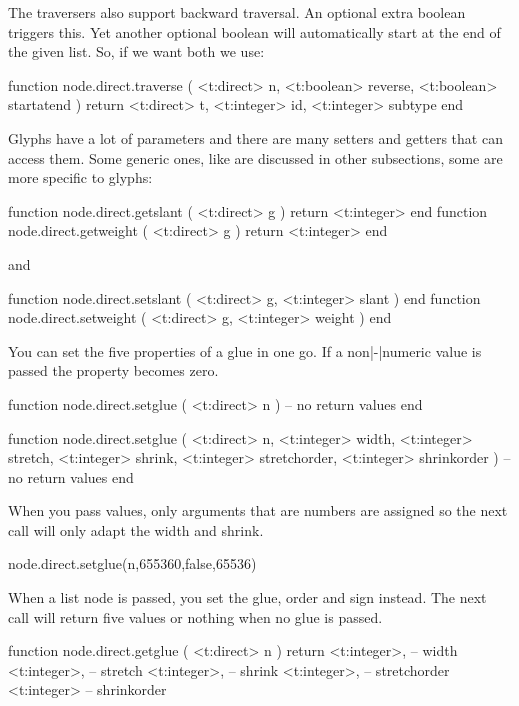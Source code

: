 The traversers also support backward traversal. An optional extra boolean triggers
this. Yet another optional boolean will automatically start at the end of the
given list. So, if we want both we use:

\starttyping[option=LUA]
function node.direct.traverse (
    <t:direct>  n,
    <t:boolean> reverse,
    <t:boolean> startatend
)
    return
        <t:direct>  t,
        <t:integer> id,
        <t:integer> subtype
end
\stoptyping

\stopsubsection

\startsubsection[title={Glyphs}]

Glyphs have a lot of parameters and there are many setters and getters that
can access them. Some generic ones, like  are discussed
in other subsections, some are more specific to glyphs:

\starttyping[option=LUA]
function node.direct.getslant  ( <t:direct> g ) return <t:integer> end
function node.direct.getweight ( <t:direct> g ) return <t:integer> end
\stoptyping

and

\starttyping[option=LUA]
function node.direct.setslant  ( <t:direct> g, <t:integer> slant  ) end
function node.direct.setweight ( <t:direct> g, <t:integer> weight ) end
\stoptyping

\stopsubsection

\startsubsection[title={Glue}]

You can set the five properties of a glue in one go. If a non|-|numeric value is
passed the property becomes zero.

\starttyping[option=LUA]
function node.direct.setglue ( <t:direct> n )
    -- no return values
end

function node.direct.setglue (
    <t:direct>  n,
    <t:integer> width,
    <t:integer> stretch,
    <t:integer> shrink,
    <t:integer> stretchorder,
    <t:integer> shrinkorder
)
    -- no return values
end
\stoptyping

When you pass values, only arguments that are numbers are assigned so the next
call will only adapt the width and shrink.

\starttyping[option=LUA]
node.direct.setglue(n,655360,false,65536)
\stoptyping


When a list node is passed, you set the glue, order and sign instead. The next
call will return five values or nothing when no glue is passed.

\starttyping[option=LUA]
function node.direct.getglue ( <t:direct> n )
    return
        <t:integer>, -- width
        <t:integer>, -- stretch
        <t:integer>, -- shrink
        <t:integer>, -- stretchorder
        <t:integer>  -- shrinkorder
\stoptyping

